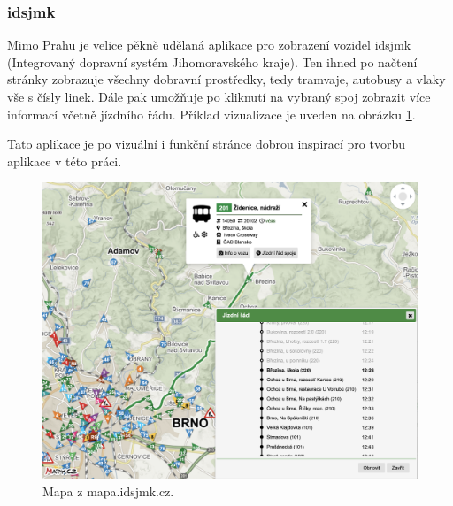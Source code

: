 \subsubsection{\gls{idsjmk}}

Mimo Prahu je velice pěkně udělaná aplikace pro zobrazení vozidel \gls{idsjmk} (Integrovaný dopravní systém Jihomoravského kraje). Ten ihned po načtení stránky zobrazuje všechny dobravní prostředky, tedy tramvaje, autobusy a vlaky vše s čísly linek. Dále pak umožňuje po kliknutí na vybraný spoj zobrazit více informací včetně jízdního řádu. Příklad vizualizace je uveden na obrázku \ref{fig:idsjmk_result}.

\bigbreak

Tato aplikace je po vizuální i funkční stránce dobrou inspirací pro tvorbu aplikace v této práci.

\begin{figure}
	\centering
  \includegraphics[width=0.5\linewidth]{../img/idsjmk_mapa.png}
  \caption{Mapa z mapa.idsjmk.cz.}
  \label{fig:idsjmk_result}
\end{figure}
